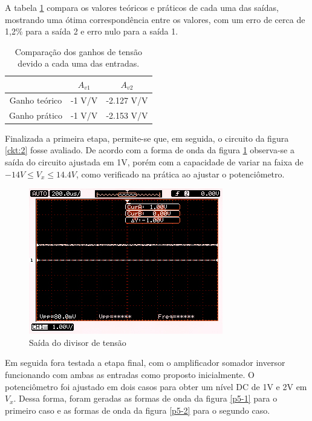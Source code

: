 A tabela \ref{tab:1} compara os valores teóricos e práticos de cada uma das saídas, mostrando uma ótima correspondência entre os valores, com um erro de cerca de 1,2\% para a saída 2 e erro nulo para a saída 1.

\begin{table}[H]
\centering
\begin{tabular}{c|c|c|}
\hline
\multicolumn{1}{|c|}{} & {$A_{v1}$} &  {$A_{v2}$}\\ \hline
\multicolumn{1}{|c|}{Ganho teórico} & {-1 V/V} &  {-2.127 V/V}\\ \hline
\multicolumn{1}{|c|}{Ganho prático} & {-1 V/V} &  {-2.153 V/V}\\ \hline
\end{tabular}
\caption{Comparação dos ganhos de tensão devido a cada uma das entradas.}
\label{tab:1}
\end{table}

Finalizada a primeira etapa, permite-se que, em seguida, o circuito da figura \ref{ckt:2} fosse avaliado. De acordo com a forma de onda da figura \ref{p4-out} observa-se a saída do circuito ajustada em 1V, porém com a capacidade de variar na faixa de $-14 V \leq V_x \leq 14.4 V$, como verificado na prática ao ajustar o potenciômetro. 



\begin{figure}[H] 
\includegraphics[scale=2.5]{imagens/p4-output.jpg} 
\centering
\caption{Saída do divisor de tensão}
\label{p4-out} 
\end{figure} 

Em seguida fora testada a etapa final, com o amplificador somador inversor funcionando com ambas as entradas como proposto inicialmente. O potenciômetro foi ajustado em dois casos para obter um nível DC de 1V e 2V em $V_x$. Dessa forma, foram geradas as formas de onda da figura \ref{p5-1} para o primeiro caso e as formas de onda da figura \ref{p5-2} para o segundo caso.

